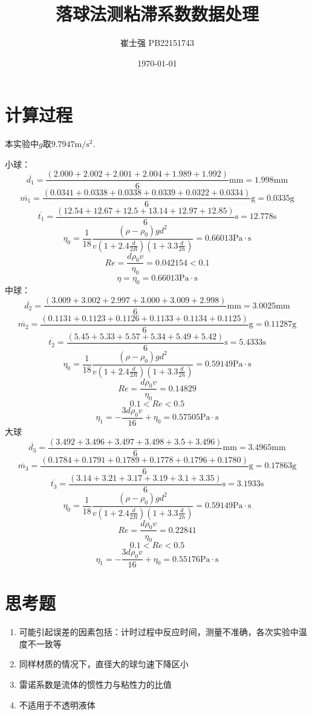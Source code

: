 \documentclass[UTF8]{ctexart}
\title{落球法测粘滞系数数据处理}
\author{崔士强 PB22151743}
\date{\today}
\begin{document}
\maketitle
\section{计算过程}
本实验中$g$取$9.7947\mathrm{m/s^2}$.

小球：
\[\overline{d_1}=\frac{\left(2.000+2.002+2.001+2.004+1.989+1.992\right)}{6}\mathrm{mm}=1.998\mathrm{mm}\]
\[\overline{m_1}=\frac{\left(0.0341+0.0338+0.0338+0.0339+0.0322+0.0334\right)}{6}\mathrm{g}=0.0335\mathrm{g}\]
\[\overline{t_1}=\frac{\left(12.54+12.67+12.5+13.14+12.97+12.85\right)}{6}\mathrm{s}=12.778\mathrm{s}\]
\[\eta_0=\frac{1}{18}\frac{\left(\rho-\rho_0\right)gd^2}{v\left(1+2.4\frac{d}{2R}\right)\left(1+3.3\frac{d}{2h}\right)}=0.66013\mathrm{Pa·s}\]
\[Re=\frac{d\rho_0v}{\eta_0}=0.042154<0.1\]
\[\eta=\eta_0=0.66013\mathrm{Pa·s}\]
\indent 中球：
\[\overline{d_2}=\frac{\left(3.009+3.002+2.997+3.000+3.009+2.998\right)}{6}\mathrm{mm}=3.0025\mathrm{mm}\]
\[\overline{m_2}=\frac{\left(0.1131+0.1123+0.1126+0.1133+0.1134+0.1125\right)}{6}\mathrm{g}=0.11287\mathrm{g}\]
\[\overline{t_2}=\frac{\left(5.45+5.33+5.57+5.34+5.49+5.42\right)}{6}\mathrm{s}=5.4333\mathrm{s}\]
\[\eta_0=\frac{1}{18}\frac{\left(\rho-\rho_0\right)gd^2}{v\left(1+2.4\frac{d}{2R}\right)\left(1+3.3\frac{d}{2h}\right)}=0.59149\mathrm{Pa·s}\]
\[Re=\frac{d\rho_0v}{\eta_0}=0.14829\]
\[0.1<Re<0.5\]
\[\eta_1=-\frac{3d\rho_0v}{16}+\eta_0=0.57505\mathrm{Pa·s}\]
\indent 大球
\[\overline{d_3}=\frac{\left(3.492+3.496+3.497+3.498+3.5+3.496\right)}{6}\mathrm{mm}=3.4965\mathrm{mm}\]
\[\overline{m_3}=\frac{\left(0.1784+0.1791+0.1789+0.1778+0.1796+0.1780\right)}{6}\mathrm{g}=0.17863\mathrm{g}\]
\[\overline{t_3}=\frac{\left(3.14+3.21+3.17+3.19+3.1+3.35\right)}{6}\mathrm{s}=3.1933\mathrm{s}\]
\[\eta_0=\frac{1}{18}\frac{\left(\rho-\rho_0\right)gd^2}{v\left(1+2.4\frac{d}{2R}\right)\left(1+3.3\frac{d}{2h}\right)}=0.59149\mathrm{Pa·s}\]
\[Re=\frac{d\rho_0v}{\eta_0}=0.22841\]
\[0.1<Re<0.5\]
\[\eta_1=-\frac{3d\rho_0v}{16}+\eta_0=0.55176\mathrm{Pa·s}\]
\section{思考题}
\begin{enumerate}
    \item 可能引起误差的因素包括：计时过程中反应时间，测量不准确，各次实验中温度不一致等
    \item 同样材质的情况下，直径大的球匀速下降区小
    \item 雷诺系数是流体的惯性力与粘性力的比值
    \item 不适用于不透明液体
\end{enumerate}

\end{document}
